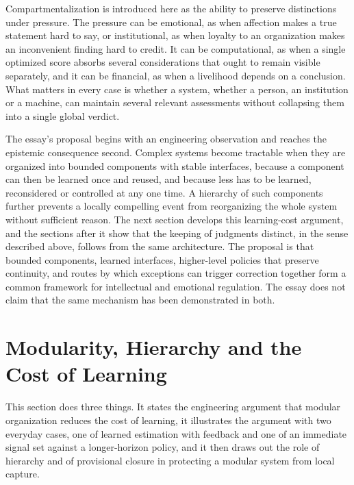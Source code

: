 \documentclass[12pt, a4paper]{article}
\begin{document}
Compartmentalization is introduced here as the ability to preserve distinctions under pressure. The pressure can be emotional, as when affection makes a true statement hard to say, or institutional, as when loyalty to an organization makes an inconvenient finding hard to credit. It can be computational, as when a single optimized score absorbs several considerations that ought to remain visible separately, and it can be financial, as when a livelihood depends on a conclusion. What matters in every case is whether a system, whether a person, an institution or a machine, can maintain several relevant assessments without collapsing them into a single global verdict.

The essay's proposal begins with an engineering observation and reaches the epistemic consequence second. Complex systems become tractable when they are organized into bounded components with stable interfaces, because a component can then be learned once and reused, and because less has to be learned, reconsidered or controlled at any one time. A hierarchy of such components further prevents a locally compelling event from reorganizing the whole system without sufficient reason. The next section develops this learning-cost argument, and the sections after it show that the keeping of judgments distinct, in the sense described above, follows from the same architecture. The proposal is that bounded components, learned interfaces, higher-level policies that preserve continuity, and routes by which exceptions can trigger correction together form a common framework for intellectual and emotional regulation. The essay does not claim that the same mechanism has been demonstrated in both.

\section{Modularity, Hierarchy and the Cost of Learning}

This section does three things. It states the engineering argument that modular organization reduces the cost of learning, it illustrates the argument with two everyday cases, one of learned estimation with feedback and one of an immediate signal set against a longer-horizon policy, and it then draws out the role of hierarchy and of provisional closure in protecting a modular system from local capture.
\end{document}
